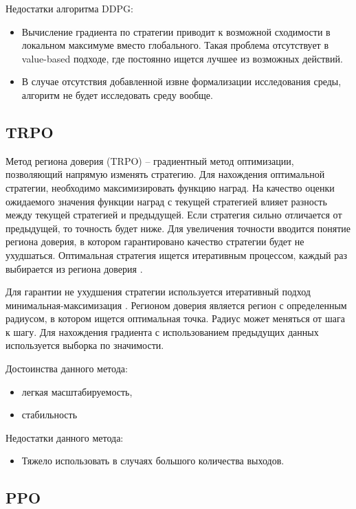 Недостатки алгоритма DDPG:
\begin{itemize}
	\item Вычисление градиента по стратегии приводит к возможной сходимости в локальном максимуме вместо глобального. Такая проблема отсутствует в value-based подходе, где постоянно ищется лучшее из возможных действий.
	\item В случае отсутствия добавленной извне формализации исследования среды, алгоритм не будет исследовать среду вообще.
\end{itemize}

\subsection{TRPO}
Метод региона доверия (TRPO) -- градиентный метод оптимизации, позволяющий напрямую изменять стратегию. 
Для нахождения оптимальной стратегии, необходимо максимизировать функцию наград. 
На качество оценки ожидаемого значения функции наград с текущей стратегией влияет разность между текущей стратегией и предыдущей. 
Если стратегия сильно отличается от предыдущей, то точность будет ниже. 
Для увеличения точности вводится понятие региона доверия, в котором гарантировано качество стратегии будет не ухудшаться. 
Оптимальная стратегия ищется итеративным процессом, каждый раз выбирается из региона доверия \cite{trpo}.

Для гарантии не ухудшения стратегии используется итеративный подход минимальная-максимизация \cite{trpo1}.
Регионом доверия является регион с определенным радиусом, в котором ищется оптимальная точка. 
Радиус может меняться от шага к шагу. Для нахождения градиента с использованием предыдущих данных используется выборка по значимости.

Достоинства данного метода:
\begin{itemize}
	\item легкая масштабируемость,
	\item стабильность
\end{itemize}

Недостатки данного метода:
\begin{itemize}
	\item Тяжело использовать в случаях большого количества выходов.
\end{itemize}


\subsection{PPO}

